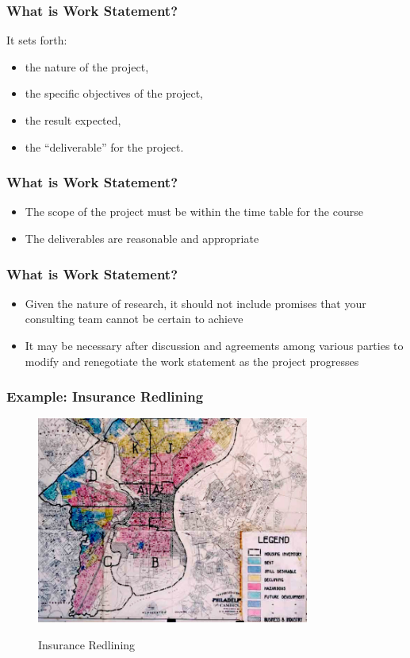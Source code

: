 \documentclass[hyperref={colorlinks=false},compress,handout,10pt]{beamer}
\let\olditem\item
\renewcommand{\item}{\setlength{\itemsep}{0.5\baselineskip}\olditem}
\begin{document}
\begin{frame}
    \frametitle{What is Work Statement?}
It sets forth: 
    \begin{itemize}
        \item the nature of the project,
        \item the specific objectives of the project, 
        \item the result expected, 
        \item the ``deliverable'' for the project.
    \end{itemize}
\end{frame}

\begin{frame}
    \frametitle{What is Work Statement?}
    \begin{itemize}
        \item The scope of the project must be within the time table for the
            course
            \vspace{1cm}
        \item The deliverables are reasonable and appropriate
    \end{itemize}
\end{frame}

\begin{frame}
    \frametitle{What is Work Statement?}
    \begin{itemize}
        \item Given the nature of research, it should not include promises
            that your consulting team cannot be certain to achieve
            \vspace{1cm}
        \item It may be necessary after discussion and agreements among
            various parties to modify and renegotiate the work statement as 
            the project progresses
    \end{itemize}
\end{frame}

\begin{frame}
    \frametitle{Example: Insurance Redlining}
    \begin{figure}
        \centering
        \href{http://en.wikipedia.org/wiki/Redlining}{
        \includegraphics[width=0.8\textwidth]{redliningPhilly.jpg}
        }
        \caption{Insurance Redlining}
                \label{fig:redlining}
    \end{figure}
\end{frame}
\end{document}
